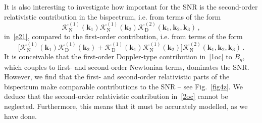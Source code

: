 It is also interesting to investigate how important for the SNR is the second-order relativistic contribution in the bispectrum, i.e. from terms of the form
\begin{equation} \label{2oc}
\mathcal{K}^{(1)}_{\mathrm{N}}(\bm{k}_{1})\mathcal{K}^{(1)}_{\mathrm{N}}(\bm{k}_{2})\mathcal{K}^{(2)}_{\mathrm{D}}(\bm{k}_{1},\bm{k}_{2},\bm{k}_{3})\,,
\end{equation}
in~\eqref{e21},  compared to the first-order contribution, i.e. from terms of the form
 \begin{equation} \label{1oc}
 \Big[\mathcal{K}^{(1)}_{\mathrm{N}}(\bm{k}_{1})\mathcal{K}^{(1)}_{\mathrm{D}}(\bm{k}_{2}) + \mathcal{K}^{(1)}_{\mathrm{D}}(\bm{k}_{1})\mathcal{K}^{(1)}_{\mathrm{N}}(\bm{k}_{2})\Big]\mathcal{K}^{(2)}_{\mathrm{N}}(\bm{k}_{1},\bm{k}_{2},\bm{k}_{3}) \,.
 \end{equation}
 It is conceivable that the first-order Doppler-type contribution in~\eqref{1oc} to $B_g$, which couples to first- and second-order Newtonian terms, dominates the SNR. However, we find that the first- and  second-order relativistic parts of the bispectrum make comparable contributions to the SNR -- see Fig.~\ref{fig4z}. We deduce that the second-order relativistic contribution in~\eqref{2oc} cannot be neglected. Furthermore, this means that it must be accurately modelled, as we  have done. 
